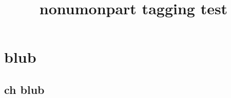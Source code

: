 \documentclass{report}
\title{nonumonpart tagging test}
\begin{document}
\tableofcontents
\thispagestyle{empty}

\part{blub}

\chapter{ch blub}
\end{document}
